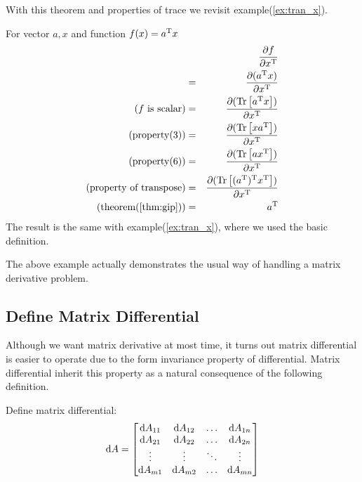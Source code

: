 With this theorem and properties of trace we revisit example(\ref{ex:tran_x}). 
\begin{myex}
	For vector $a,x$ and function $f(x) = a^\mathrm{T}x$
	\begin{eqnarray}
	 &&\dfrac{\partial f}{\partial x^\mathrm{T}} \\
		&=& \dfrac{\partial ( a^\mathrm{T}x )}{\partial x^\mathrm{T}} \\
	\text{($f$ is scalar)}	&=& \dfrac{\partial ( \mathrm{Tr}\left[a^\mathrm{T}x\right] )}{\partial x^\mathrm{T}} \\
	\text{(property(3))}	&=& \dfrac{\partial ( \mathrm{Tr}\left[xa^\mathrm{T}\right] )}{\partial x^\mathrm{T}} \\
	\text{(property(6))}	&=& \dfrac{\partial ( \mathrm{Tr}\left[ax^\mathrm{T}\right] )}{\partial x^\mathrm{T}} \\
	\text{(property of transpose)}	&=& \dfrac{\partial ( \mathrm{Tr}\left[(a^\mathrm{T})^\mathrm{T}x^\mathrm{T}\right] )}{\partial x^\mathrm{T}} \\
	\text{(theorem(\ref{thm:gip}))}	&=& a^\mathrm{T}
	\end{eqnarray}
	The result is the same with example(\ref{ex:tran_x}), 
	where we used the basic definition. 
\end{myex}

The above example actually demonstrates the usual way of handling a 
matrix derivative problem. 

\subsection{Define Matrix Differential}

Although we want matrix derivative at most time, it turns out 
matrix differential is easier to operate due to the 
form invariance property of differential. Matrix differential 
inherit this property as a natural consequence of the 
following definition. 

\begin{mydef}
	\label{def:mdiff}
	Define matrix differential:
	\begin{equation}
		\mathrm{d}A = \left[
		\begin{matrix}
			\mathrm{d}A_{11} & \mathrm{d}A_{12} & \ldots &\mathrm{d}A_{1n}\\
			\mathrm{d}A_{21} & \mathrm{d}A_{22} & \ldots &\mathrm{d}A_{2n}\\
			\vdots & \vdots & \ddots & \vdots \\
			\mathrm{d}A_{m1} & \mathrm{d}A_{m2} & \ldots &\mathrm{d}A_{mn}\\
		\end{matrix}
		\right]
	\end{equation}	 
\end{mydef}

